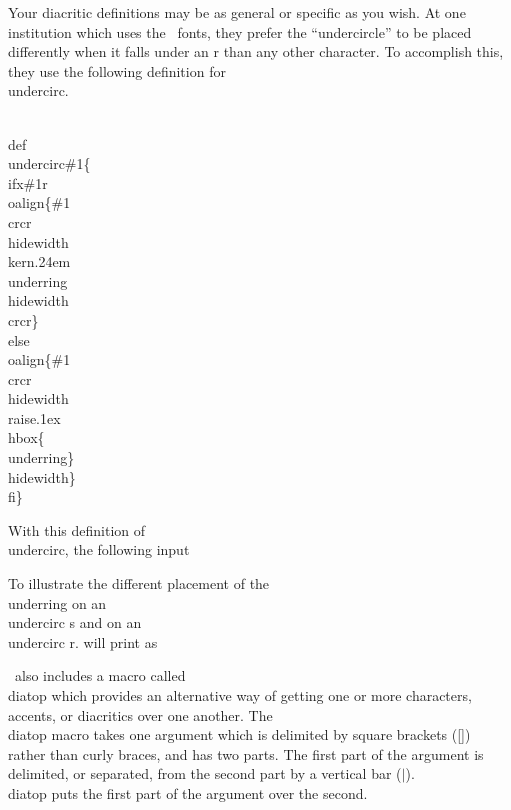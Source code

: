 Your diacritic definitions may be as general or specific as you wish. At one
institution which uses the \wsu\ fonts, they prefer the ``undercircle'' to be
placed differently when it falls under an r than any other character. To
accomplish this, they use the following definition for \\undercirc.
 
\aib\lin{-10pt}
\\def\\undercirc\#1\{\\ifx\#1r
      \\oalign\{\#1\\crcr\\hidewidth\\kern.24em\\underring
            \\hidewidth\\crcr\}
      \\else\\oalign\{\#1\\crcr
            \\hidewidth\\raise.1ex\\hbox\{\\underring\}\\hidewidth\}
                      \\fi\}
\aie
 
With this definition of \\undercirc, the following input
 
\aib
To illustrate the different placement of the \\underring on
an \\undercirc s and on an \\undercirc r.
\aie
\nin will print as
\vs{5pt}
\vs{5pt}
 
\ipam\
also includes a macro called \\diatop which provides an alternative way
of getting one or more characters, accents, or diacritics over one another. The
\\diatop macro takes one argument which is delimited by square brackets ([])
rather than curly braces, and has two parts. The first part of the
argument is delimited, or separated, from the second part by a vertical bar
($\vert$). \\diatop puts the first part of the argument over the second.
 
